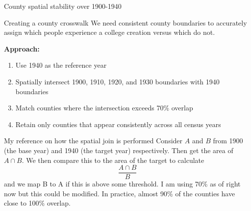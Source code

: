 \documentclass[notes,11pt, aspectratio=169]{beamer}
\begin{document}
\begin{frame}[label=spatialstability]{County spatial stability over 1900-1940}
    

    \vspace{1em}
    \centering
    \hyperlink{isolating}{}
\end{frame}

\begin{frame}[label=countycrosswalk]{Creating a county crosswalk}
We need consistent county boundaries to accurately assign which people experience a college creation versus which do not.

\textbf{Approach:}
\begin{enumerate}
\item Use 1940 as the reference year
\item Spatially intersect 1900, 1910, 1920, and 1930 boundaries with 1940 boundaries
\item Match counties where the intersection exceeds 70\% overlap
\item Retain only counties that appear consistently across all census years
\end{enumerate}
\vspace{1em}
\centering
\hyperlink{isolating}{}
\end{frame}

\begin{frame}{My reference on how the spatial join is performed}
  Consider $A$ and $B$ from 1900 (the base year) and 1940 (the target year) respectively. Then get the area of $A\cap B$. We then compare this to the area of the target to calculate 
  \begin{equation}
  \frac{A\cap B}{B}  
  \end{equation}
  and we map B to A if this is above some threshold. I am using 70\% as of right now but this could be modified. In practice, almost 90\% of the counties have close to 100\% overlap.
\end{frame}
\end{document}
